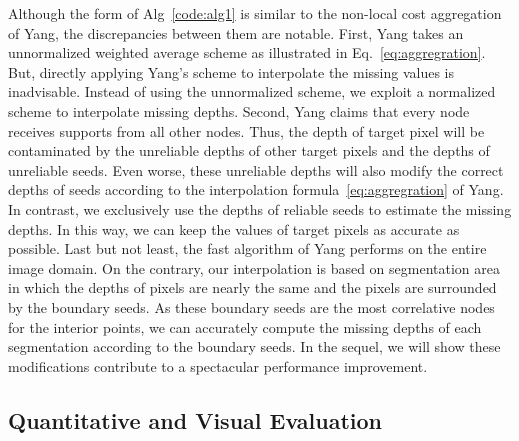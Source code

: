 \documentclass[preprint,10pt,5p,times,twocolumn]{elsarticle}
\begin{document}
Although the form of Alg~\ref{code:alg1} is similar to the non-local cost aggregation~\cite{Yang2012} of Yang, the discrepancies between them are notable. First, Yang takes an unnormalized weighted average scheme as illustrated in Eq.~\eqref{eq:aggregration}. But, directly applying Yang's scheme to interpolate the missing values is inadvisable. Instead of using the unnormalized scheme, we exploit a normalized scheme to interpolate missing depths. Second, Yang claims that every node receives supports from all other nodes. Thus, the depth of target pixel will be contaminated by the unreliable depths of other target pixels and the depths of unreliable seeds. Even worse, these unreliable depths will also modify the correct depths of seeds according to the interpolation formula~\eqref{eq:aggregration} of Yang. In contrast, we exclusively use the depths of reliable seeds to estimate the missing depths. In this way, we can keep the values of target pixels as accurate as possible.  Last but not least, the fast algorithm of Yang performs on the entire image domain. On the contrary, our interpolation is based on segmentation area in which the depths of pixels are nearly the same and the pixels are surrounded by the boundary seeds. As these boundary seeds are the most correlative nodes for the interior points, we can accurately compute the missing depths of each segmentation according to the boundary seeds. In the sequel, we will show these modifications contribute to a spectacular performance improvement.


\subsection{Quantitative and Visual Evaluation}
\end{document}
